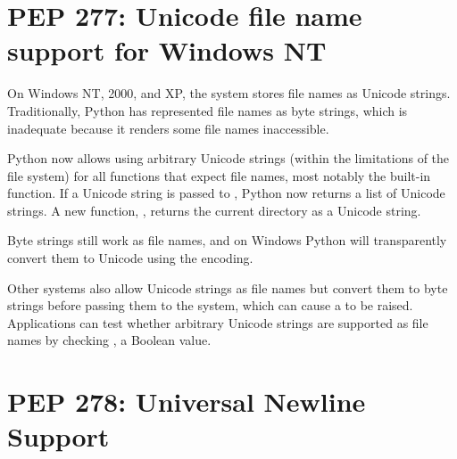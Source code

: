 \documentclass{howto}
\begin{document}
\begin{seealso}


\end{seealso}


\section{PEP 277: Unicode file name support for Windows NT}

On Windows NT, 2000, and XP, the system stores file names as Unicode
strings. Traditionally, Python has represented file names as byte
strings, which is inadequate because it renders some file names
inaccessible.

Python now allows using arbitrary Unicode strings (within the
limitations of the file system) for all functions that expect file
names, most notably the  built-in function. If a Unicode
string is passed to , Python now returns a list
of Unicode strings.  A new function, , returns
the current directory as a Unicode string.

Byte strings still work as file names, and on Windows Python will
transparently convert them to Unicode using the  encoding.

Other systems also allow Unicode strings as file names but convert
them to byte strings before passing them to the system, which can
cause a  to be raised. Applications can test
whether arbitrary Unicode strings are supported as file names by
checking , a Boolean value.

\begin{seealso}


\end{seealso}


\section{PEP 278: Universal Newline Support}
\end{document}
